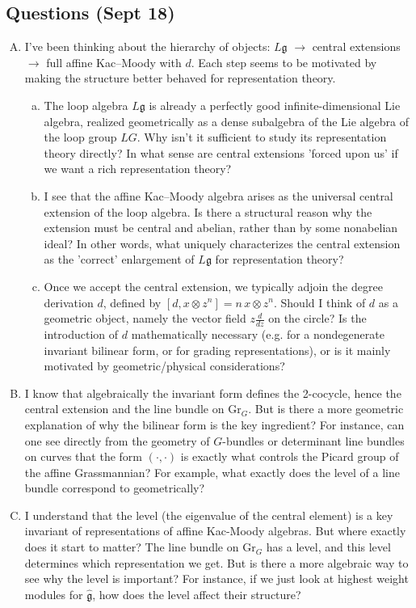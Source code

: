 \documentclass[12pt]{article}
\begin{document}
\subsection*{Questions (Sept 18)}
\begin{enumerate}[A.]
    \item I've been thinking about the hierarchy of objects: $L\mathfrak g$ $\to$ central extensions $\to$ full affine Kac–Moody with $d$. Each step seems to be motivated by making the structure better behaved for representation theory.
          \begin{enumerate}[(a)]
              \item The loop algebra $L\mathfrak g$ is already a perfectly good infinite-dimensional Lie algebra, realized geometrically as a dense subalgebra of the Lie algebra of the loop group $LG$. Why isn't it sufficient to study its representation theory directly? In what sense are central extensions 'forced upon us' if we want a rich representation theory?
              \item I see that the affine Kac–Moody algebra arises as the universal central extension of the loop algebra. Is there a structural reason why the extension must be central and abelian, rather than by some nonabelian ideal? In other words, what uniquely characterizes the central extension as the 'correct' enlargement of $L\mathfrak g$ for representation theory?
              \item Once we accept the central extension, we typically adjoin the degree derivation $d$, defined by $[d, x\otimes z^n]=n\,x\otimes z^n$. Should I think of $d$ as a geometric object, namely the vector field $z\frac{d}{dz}$ on the circle? Is the introduction of $d$ mathematically necessary (e.g. for a nondegenerate invariant bilinear form, or for grading representations), or is it mainly motivated by geometric/physical considerations?
          \end{enumerate}
    \item I know that algebraically the invariant form defines the 2-cocycle, hence the central extension and the line bundle on $\mathrm{Gr}_G$. But is there a more geometric explanation of why the bilinear form is the key ingredient? For instance, can one see directly from the geometry of $G$-bundles or determinant line bundles on curves that the form $(\cdot,\cdot)$ is exactly what controls the Picard group of the affine Grassmannian? For example, what exactly does the level of a line bundle correspond to geometrically?
    \item I understand that the level (the eigenvalue of the central element) is a key invariant of representations of affine Kac-Moody algebras. But where exactly does it start to matter? The line bundle on $\mathrm{Gr}_G$ has a level, and this level determines which representation we get. But is there a more algebraic way to see why the level is important? For instance, if we just look at highest weight modules for $\widehat{\mathfrak g}$, how does the level affect their structure?
\end{enumerate}
\end{document}
